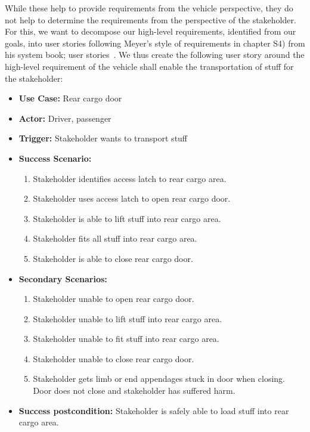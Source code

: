 While these help to provide requirements from the vehicle perspective, they do not help to determine the requirements from the perspective of the stakeholder. For this, we want to decompose our high-level requirements, identified from our goals, into user stories following Meyer's style of requirements in chapter S4) from his system book; user stories~\cite{meyer2022handbook}. We thus create the following user story around the high-level requirement of the vehicle shall enable the transportation of stuff for the stakeholder:
\begin{itemize}
	\item \textbf{Use Case:} Rear cargo door
	\item \textbf{Actor:} Driver, passenger
	\item \textbf{Trigger:} Stakeholder wants to transport stuff
	\item \textbf{Success Scenario:}
	\begin{enumerate}
		\item Stakeholder identifies access latch to rear cargo area.
		\item Stakeholder uses access latch to open rear cargo door.
		\item Stakeholder is able to lift stuff into rear cargo area.
		\item Stakeholder fits all stuff into rear cargo area.
		\item Stakeholder is able to close rear cargo door.
	\end{enumerate}
	\item \textbf{Secondary Scenarios:}
	\begin{enumerate}
		\item Stakeholder unable to open rear cargo door.
		\item Stakeholder unable to lift stuff into rear cargo area.
		\item Stakeholder unable to fit stuff into rear cargo area.
		\item Stakeholder unable to close rear cargo door.
		\item Stakeholder gets limb or end appendages stuck in door when closing. Door does not close and stakeholder has suffered harm.
	\end{enumerate}
	\item \textbf{Success postcondition:} Stakeholder is safely able to load stuff into rear cargo area.
\end{itemize}

